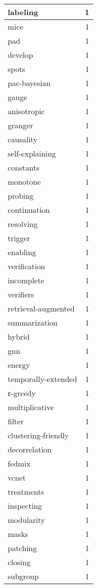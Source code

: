 \begin{table}[h]
\begin{tabular}{|l|r|}
labeling & 1 \\
\hline
mice & 1 \\
\hline
pad & 1 \\
\hline
develop & 1 \\
\hline
spots & 1 \\
\hline
pac-bayesian & 1 \\
\hline
gauge & 1 \\
\hline
anisotropic & 1 \\
\hline
granger & 1 \\
\hline
causality & 1 \\
\hline
self-explaining & 1 \\
\hline
constants & 1 \\
\hline
monotone & 1 \\
\hline
probing & 1 \\
\hline
continuation & 1 \\
\hline
resolving & 1 \\
\hline
trigger & 1 \\
\hline
enabling & 1 \\
\hline
verification & 1 \\
\hline
incomplete & 1 \\
\hline
verifiers & 1 \\
\hline
retrieval-augmented & 1 \\
\hline
summarization & 1 \\
\hline
hybrid & 1 \\
\hline
gnn & 1 \\
\hline
energy & 1 \\
\hline
temporally-extended & 1 \\
\hline
ε-greedy & 1 \\
\hline
multiplicative & 1 \\
\hline
filter & 1 \\
\hline
clustering-friendly & 1 \\
\hline
decorrelation & 1 \\
\hline
fedmix & 1 \\
\hline
vcnet & 1 \\
\hline
treatments & 1 \\
\hline
inspecting & 1 \\
\hline
modularity & 1 \\
\hline
masks & 1 \\
\hline
patching & 1 \\
\hline
closing & 1 \\
\hline
subgroup & 1 \\

\end{tabular}
\end{table}
